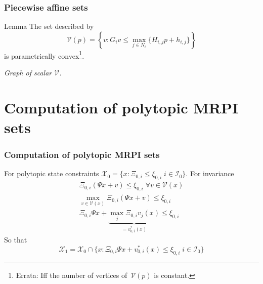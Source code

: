 \documentclass{beamer}
\theoremstyle{plain}
\begin{document}
\begin{frame}
\frametitle{Piecewise affine sets}

\begin{block}{Lemma}
The set described by
\begin{equation*}
	\mathcal V(p) = \left\{v: G_i v\leq \max_{j\in N_i}\{H_{i,j}p + h_{i,j}\} \right\}
\end{equation*}
is parametrically convex\footnote{Errata: Iff the number of vertices of~$\mathcal V(p)$ is constant.}.
\end{block}

\begin{center}
\end{center}
\centering
\it{Graph of scalar $\mathcal V$.}

\end{frame}

\section{Computation of polytopic MRPI sets}
\begin{frame}
\frametitle{Computation of polytopic MRPI sets}
For polytopic state constraints $\mathcal X_0 = \{x: \Xi_{0,i}\leq \xi_{0,i}\;i\in\mathcal I_0\}$.
For invariance
\begin{equation*}\begin{split}
	\Xi_{0,i}(\Psi x + v)\leq \xi_{0,i} \; \forall v\in \mathcal V(x)\\
	\max_{v\in \mathcal V(x)}\Xi_{0,i}(\Psi x + v)\leq \xi_{0,i}\\
	\Xi_{0,i}\Psi x + \underbrace{\max_{j} \Xi_{0,i} v_j(x)}_{=v_{0,i}^\ast(x)}\leq \xi_{0,i}
\end{split}\end{equation*}
So that
\begin{equation*}
	\mathcal X_1 = \mathcal X_0 \cap \{x: \Xi_{0,i}\Psi x + v_{0,i}^\ast(x)\leq \xi_{0,i}\; i\in\mathcal I_0\}
\end{equation*}

\end{frame}
\end{document}
